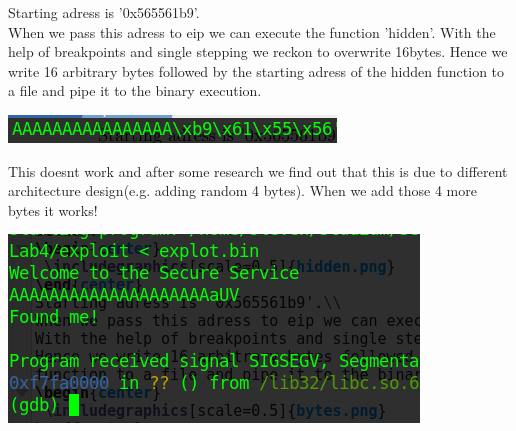 \documentclass[a4paper,10pt]{article}
\begin{document}
Starting adress is '0x565561b9'.\\
When we pass this adress to eip we can execute the function 'hidden'.
With the help of breakpoints and single stepping we reckon to overwrite 16bytes.
Hence we write 16 arbitrary bytes followed by the starting adress of the hidden function to a file and pipe it to the binary execution. 
\begin{center}
 \includegraphics[scale=0.5]{bytes.png}
\end{center}
This doesnt work and after some research we find out that this is due to different architecture design(e.g. adding random 4 bytes). When we add those 4 more bytes it works!
\begin{center}
 \includegraphics[scale=0.5]{found.png}
\end{center}
\end{document}
